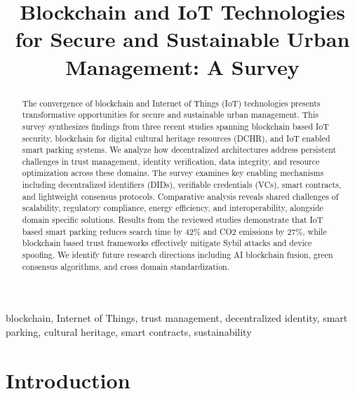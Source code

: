 \documentclass[conference]{IEEEtran}
\begin{document}
\title{Blockchain and IoT Technologies for Secure and Sustainable Urban Management: A Survey}

\author{
}

\maketitle


\begin{abstract}
The convergence of blockchain and Internet of Things (IoT) technologies presents transformative opportunities for secure and sustainable urban management. This survey synthesizes findings from three recent studies spanning blockchain based IoT security, blockchain for digital cultural heritage resources (DCHR), and IoT enabled smart parking systems. We analyze how decentralized architectures address persistent challenges in trust management, identity verification, data integrity, and resource optimization across these domains. The survey examines key enabling mechanisms including decentralized identifiers (DIDs), verifiable credentials (VCs), smart contracts, and lightweight consensus protocols. Comparative analysis reveals shared challenges of scalability, regulatory compliance, energy efficiency, and interoperability, alongside domain specific solutions. Results from the reviewed studies demonstrate that IoT based smart parking reduces search time by 42\% and CO2 emissions by 27\%, while blockchain based trust frameworks effectively mitigate Sybil attacks and device spoofing. We identify future research directions including AI blockchain fusion, green consensus algorithms, and cross domain standardization.
\end{abstract}

\begin{IEEEkeywords}
blockchain, Internet of Things, trust management, decentralized identity, smart parking, cultural heritage, smart contracts, sustainability
\end{IEEEkeywords}

\section{Introduction}
\end{document}
